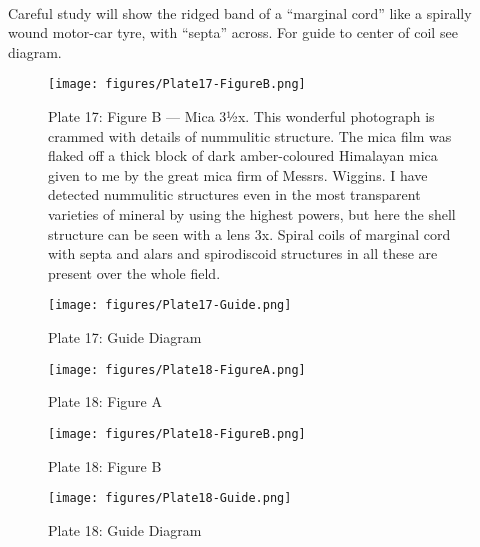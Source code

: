 \documentclass[a4paper, 12pt, oneside]{article}
\begin{document}
\paragraph{}
Careful study will show the ridged band of a ``marginal cord'' like a spirally wound motor-car tyre, with ``septa'' across. For guide to center of coil see diagram.
\clearpage
\begin{figure}[b]
\centering
\texttt{[image: figures/Plate17-FigureB.png]}
\caption{\small Plate 17: Figure B --- Mica 3½x. This wonderful photograph is crammed with details of nummulitic structure. The mica film was flaked off a thick block of dark amber-coloured Himalayan mica given to me by the great mica firm of Messrs. Wiggins. I have detected nummulitic structures even in the most transparent varieties of mineral by using the highest powers, but here the shell structure can be seen with a lens 3x. Spiral coils of marginal cord with septa and alars and spirodiscoid structures in all these are present over the whole field.}
\end{figure}
\clearpage
\begin{figure}[b]
\centering
\texttt{[image: figures/Plate17-Guide.png]}
\caption{\small Plate 17: Guide Diagram}
\end{figure}
\clearpage
{}
\cfoot{\thepage}
\begin{figure}[b]
\centering
\texttt{[image: figures/Plate18-FigureA.png]}
\caption{\small Plate 18: Figure A}
\end{figure}
\clearpage
\begin{figure}[b]
\centering
\texttt{[image: figures/Plate18-FigureB.png]}
\caption{\small Plate 18: Figure B}
\end{figure}
\clearpage
\begin{figure}[b]
\centering
\texttt{[image: figures/Plate18-Guide.png]}
\caption{\small Plate 18: Guide Diagram}
\end{figure}
\clearpage
{}
\cfoot{\thepage}
\end{document}
